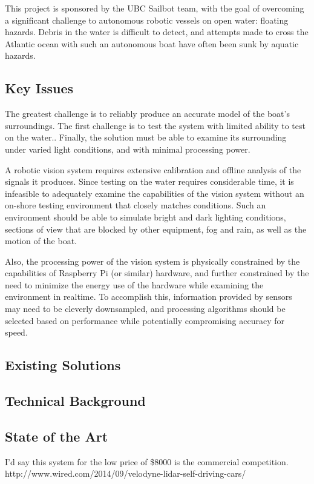 This project is sponsored by the UBC Sailbot team, with the goal of overcoming a significant challenge to autonomous robotic vessels on open water: floating hazards. Debris in the water is difficult to detect, and attempts made to cross the Atlantic ocean with such an autonomous boat have often been sunk by aquatic hazards.

\subsection{\label{sec:intro:key-issues}Key Issues}
The greatest challenge is to reliably produce an accurate model of the boat's surroundings. The first challenge is to test the system with limited ability to test on the water.. Finally, the solution must be able to examine its surrounding under varied light conditions, and with minimal processing power.

A robotic vision system requires extensive calibration and offline analysis of the signals it produces. Since testing on the water requires considerable time, it is infeasible to adequately examine the capabilities of the vision system without an on-shore testing environment that closely matches conditions. Such an environment should be able to simulate bright and dark lighting conditions, sections of view that are blocked by other equipment, fog and rain, as well as the motion of the boat.

Also, the processing power of the vision system is physically constrained by the capabilities of Raspberry Pi (or similar) hardware, and further constrained by the need to minimize the energy use of the hardware while examining the environment in realtime. To accomplish this, information provided by sensors may need to be cleverly downsampled, and processing algorithms should be selected based on performance while potentially compromising accuracy for speed.

\subsection{\label{sec:intro:existing-solutions}Existing Solutions}

\subsection{\label{sec:intro:technical-background}Technical Background}

\subsection{\label{sec:intro:commercial}State of the Art}
I'd say this system for the low price of \$8000 is the commercial competition.\\
http://www.wired.com/2014/09/velodyne-lidar-self-driving-cars/\\

